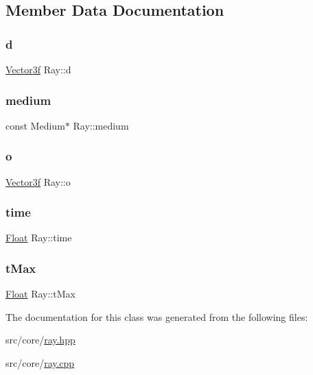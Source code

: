 \subsection{Member Data Documentation}
\mbox{\label{classRay_adf1b913872391bb739c891d86416cf92}} 
\subsubsection{\texorpdfstring{d}{d}}
{\footnotesize\ttfamily \mbox{\hyperlink{cyclop_8hpp_a5a0a2e85b081623ef3f7e7e8d43024f5}{Vector3f}} Ray\+::d}

\mbox{\label{classRay_a813f5ced5f02efcc75eabc6aedfa7824}} 
\subsubsection{\texorpdfstring{medium}{medium}}
{\footnotesize\ttfamily const Medium$\ast$ Ray\+::medium}

\mbox{\label{classRay_a89ed1e9bbc4c72c4d44f6d5a615640ae}} 
\subsubsection{\texorpdfstring{o}{o}}
{\footnotesize\ttfamily \mbox{\hyperlink{cyclop_8hpp_a5a0a2e85b081623ef3f7e7e8d43024f5}{Vector3f}} Ray\+::o}

\mbox{\label{classRay_a6b9ba0e2c874503b5a3b72e609b75ece}} 
\subsubsection{\texorpdfstring{time}{time}}
{\footnotesize\ttfamily \mbox{\hyperlink{cyclop_8hpp_a07afd7094cb489cbd514c76e6f55d34f}{Float}} Ray\+::time}

\mbox{\label{classRay_a75dad117c0ccb7aba43c68b326c1d2ac}} 
\subsubsection{\texorpdfstring{tMax}{tMax}}
{\footnotesize\ttfamily \mbox{\hyperlink{cyclop_8hpp_a07afd7094cb489cbd514c76e6f55d34f}{Float}} Ray\+::t\+Max\hspace{0.3cm}{\ttfamily [mutable]}}



The documentation for this class was generated from the following files\+:\begin{DoxyCompactItemize}
\item 
src/core/\mbox{\hyperlink{ray_8hpp}{ray.\+hpp}}\item 
src/core/\mbox{\hyperlink{ray_8cpp}{ray.\+cpp}}\end{DoxyCompactItemize}
